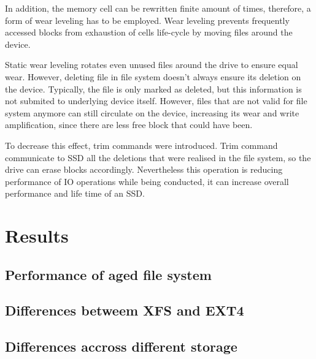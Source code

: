 \documentclass[
  color, %
  table, %
  lof,   %
  lot,   %
]{fithesis3}
\begin{document}
In addition, the memory cell can be rewritten finite amount of times, therefore, a form of wear leveling has to be employed. Wear leveling prevents frequently accessed blocks from exhaustion of cells life-cycle by moving files around the device.

Static wear leveling rotates even unused files around the drive to ensure equal wear. However, deleting file in file system doesn't always ensure its deletion on the device. Typically, the file is only marked as deleted, but this information is not submited to underlying device itself. However, files that are not valid for file system anymore can still circulate on the device, increasing its wear and write amplification, since there are less free block that could have been.

To decrease this effect, trim commands were introduced. Trim command communicate to SSD all the deletions that were realised in the file system, so the drive can erase blocks accordingly. Nevertheless this operation is reducing performance of IO operations while being conducted, it can increase overall performance and life time of an SSD.



\chapter{Results}

\section{Performance of aged file system}
\section{Differences betweem XFS and EXT4}
\section{Differences accross different storage}
\end{document}
